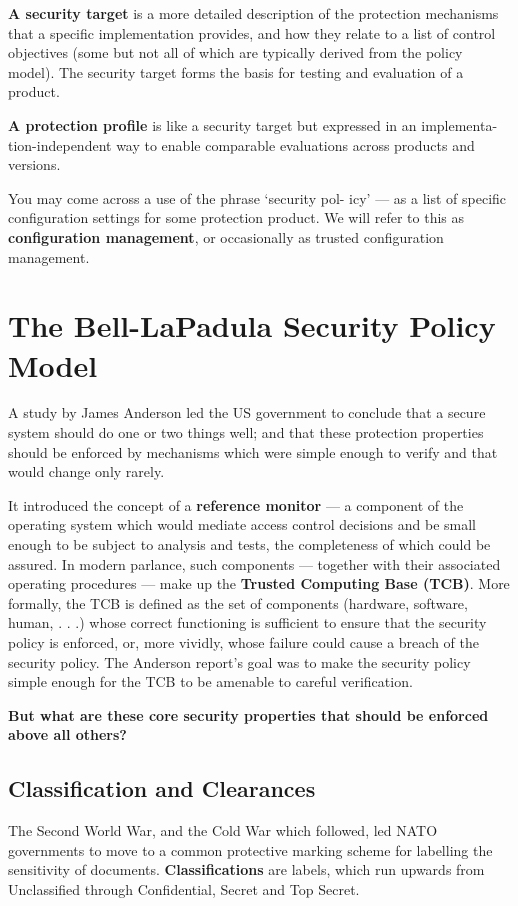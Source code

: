 		{\bf A security target} is a more detailed description of the protection mechanisms
		that a specific implementation provides, and how they relate to a list of control
		objectives (some but not all of which are typically derived from the policy
		model). The security target forms the basis for testing and evaluation of a
		product.
		
		{\bf A protection profile} is like a security target but expressed in an implementa-
		tion-independent way to enable comparable evaluations across products and
		versions. 

		You may come across a use of the phrase ‘security pol-
		icy’ — as a list of specific configuration settings for some protection product.
		We will refer to this as {\bf configuration management}, or occasionally as trusted
		configuration management.

	\section{The Bell-LaPadula Security Policy Model}

		A study by James Anderson led the US government to conclude that a
		secure system should do one or two things well; and that these protection
		properties should be enforced by mechanisms which were simple enough to
		verify and that would change only rarely. 

		It introduced the concept of a {\bf reference monitor} — a component of the operating 
		system which would mediate access control decisions and be small enough to be 
		subject to analysis and tests, the completeness of which could be assured. 
		In modern parlance, such components — together with their associated operating
		procedures — make up the {\bf Trusted Computing Base (TCB)}. 
		More formally, the TCB is defined as the set of components 
		(hardware, software, human, . . .) whose correct functioning is sufficient to 
		ensure that the security policy is enforced, or, more vividly,
		whose failure could cause a breach of the security policy. The Anderson
		report’s goal was to make the security policy simple enough for the TCB to be
		amenable to careful verification.

		{\bf But what are these core security properties that should be enforced above
		all others?}

		\subsection{Classification and Clearances}
			The Second World War, and the Cold War which followed, led NATO
			governments to move to a common protective marking scheme for labelling
			the sensitivity of documents. {\bf Classifications} are labels, which run 
			upwards from Unclassified through Confidential, Secret and Top Secret.

